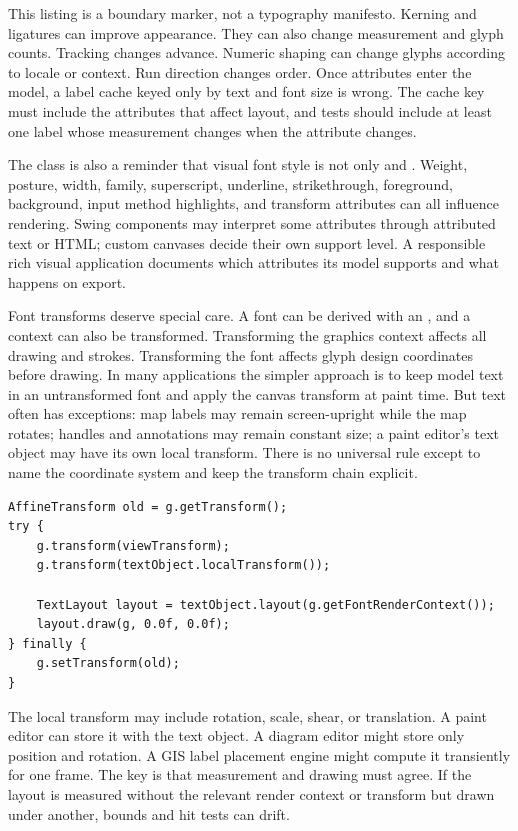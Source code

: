 This listing is a boundary marker, not a typography manifesto. Kerning and ligatures can improve appearance. They can also change measurement and glyph counts. Tracking changes advance. Numeric shaping can change glyphs according to locale or context. Run direction changes order. Once attributes enter the model, a label cache keyed only by text and font size is wrong. The cache key must include the attributes that affect layout, and tests should include at least one label whose measurement changes when the attribute changes.

The class  is also a reminder that visual font style is not only  and . Weight, posture, width, family, superscript, underline, strikethrough, foreground, background, input method highlights, and transform attributes can all influence rendering. Swing components may interpret some attributes through attributed text or HTML; custom canvases decide their own support level. A responsible rich visual application documents which attributes its model supports and what happens on export.

Font transforms deserve special care. A font can be derived with an , and a  context can also be transformed. Transforming the graphics context affects all drawing and strokes. Transforming the font affects glyph design coordinates before drawing. In many applications the simpler approach is to keep model text in an untransformed font and apply the canvas transform at paint time. But text often has exceptions: map labels may remain screen-upright while the map rotates; handles and annotations may remain constant size; a paint editor's text object may have its own local transform. There is no universal rule except to name the coordinate system and keep the transform chain explicit.

\begin{lstlisting}[caption={Drawing text through a local object transform.}]
AffineTransform old = g.getTransform();
try {
    g.transform(viewTransform);
    g.transform(textObject.localTransform());

    TextLayout layout = textObject.layout(g.getFontRenderContext());
    layout.draw(g, 0.0f, 0.0f);
} finally {
    g.setTransform(old);
}
\end{lstlisting}

The local transform may include rotation, scale, shear, or translation. A paint editor can store it with the text object. A diagram editor might store only position and rotation. A GIS label placement engine might compute it transiently for one frame. The key is that measurement and drawing must agree. If the layout is measured without the relevant render context or transform but drawn under another, bounds and hit tests can drift.

